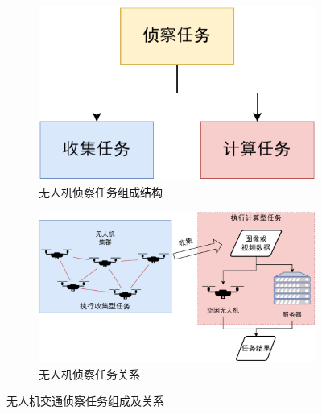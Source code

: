 \begin{figure}[!htbp]
    \centering
    \begin{subfigure}[t]{0.4\textwidth}
        \captionsetup{justification=centering}
        \begin{minipage}[b]{\linewidth}
            \includegraphics[width=\textwidth]{images/无人机侦察任务组成.pdf}
            \caption{无人机侦察任务组成结构}
            \label{fig:无人机侦察任务组成结构}
        \end{minipage}
    \end{subfigure}
    \begin{subfigure}[t]{0.75\textwidth}
        \captionsetup{justification=centering}
        \begin{minipage}[b]{\linewidth}
            \includegraphics[width=\textwidth]{images/无人机侦察任务关系.pdf}
            \caption{无人机侦察任务关系}
            \label{fig:无人机侦察任务关系}
        \end{minipage}
    \end{subfigure}

    \caption{无人机交通侦察任务组成及关系}
    \label{fig:无人机交通侦察任务组成及关系}
\end{figure}

